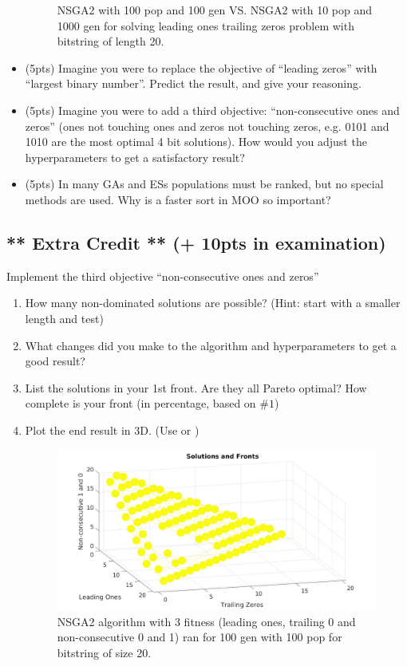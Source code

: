 \documentclass{article}
\begin{document}
\begin{itemize}
\begin{figure}[htpb]
            \caption{NSGA2 with 100 pop and 100 gen VS\@. NSGA2 with 10 pop and 1000 gen for solving leading ones trailing zeros problem with bitstring of length 20.}\label{fig:comparision}
        \end{figure}
	\item (5pts) Imagine you were to replace the objective of ``leading zeros'' with ``largest binary number''. Predict the result, and give your reasoning.
	\item (5pts) Imagine you were to add a third objective: ``non-consecutive ones and zeros'' (ones not touching ones and zeros not touching zeros, e.g. 0101 and 1010 are the most optimal 4 bit solutions). How would you adjust the hyperparameters to get a satisfactory result?
	\item (5pts) In many GAs and ESs populations must be ranked, but no special methods are used. Why is a faster sort in MOO so important?
\end{itemize}

\newpage
\subsection{** Extra Credit ** (+ 10pts in examination)}
Implement the third objective ``non-consecutive ones and zeros''
\begin{enumerate}
	\item How many non-dominated solutions are possible? (Hint: start with a smaller length and test)
	\item What changes did you make to the algorithm and hyperparameters to get a good result?
	\item List the solutions in your 1st front. Are they all Pareto optimal? How complete is your front (in percentage, based on $\#1$)
	\item Plot the end result in 3D. (Use  or )
        \begin{figure}[htpb]
            \centering
            \includegraphics[width=1.0\linewidth]{3dextraQuestion.jpg}
            \caption{NSGA2 algorithm with 3 fitness (leading ones, trailing 0 and non-consecutive 0 and 1) ran for 100 gen with 100 pop for bitstring of size 20.}\label{fig:3dplot}
        \end{figure}
\end{enumerate}
\end{document}
